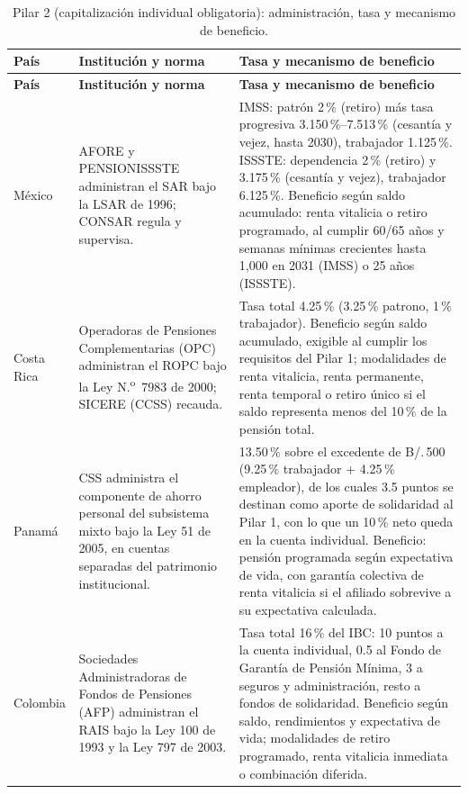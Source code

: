 \documentclass[12pt, letterpaper]{article}
\begin{document}
\begin{xltabular}{\textwidth}{P{1.6cm}Y Y}
\caption{Pilar 2 (capitalización individual obligatoria): administración, tasa y mecanismo de beneficio.}
\label{tab:param_pilar2}\\
\toprule
\textbf{País} & \textbf{Institución y norma} & \textbf{Tasa y mecanismo de beneficio} \\
\midrule
\endfirsthead

\toprule
\textbf{País} & \textbf{Institución y norma} & \textbf{Tasa y mecanismo de beneficio} \\
\midrule
\endhead

\bottomrule
\endfoot

México &
AFORE y PENSIONISSSTE administran el SAR bajo la LSAR de 1996; CONSAR regula y supervisa. &
IMSS: patrón 2\,\% (retiro) más tasa progresiva 3.150\,\%--7.513\,\% (cesantía y vejez, hasta 2030), trabajador 1.125\,\%. ISSSTE: dependencia 2\,\% (retiro) y 3.175\,\% (cesantía y vejez), trabajador 6.125\,\%. Beneficio según saldo acumulado: renta vitalicia o retiro programado, al cumplir 60/65 años y semanas mínimas crecientes hasta 1{,}000 en 2031 (IMSS) o 25 años (ISSSTE). \\

Costa Rica &
Operadoras de Pensiones Complementarias (OPC) administran el ROPC bajo la Ley N.\textsuperscript{o}~7983 de 2000; SICERE (CCSS) recauda. &
Tasa total 4.25\,\% (3.25\,\% patrono, 1\,\% trabajador). Beneficio según saldo acumulado, exigible al cumplir los requisitos del Pilar 1; modalidades de renta vitalicia, renta permanente, renta temporal o retiro único si el saldo representa menos del 10\,\% de la pensión total. \\

Panamá &
CSS administra el componente de ahorro personal del subsistema mixto bajo la Ley 51 de 2005, en cuentas separadas del patrimonio institucional. &
13.50\,\% sobre el excedente de B/.\,500 (9.25\,\% trabajador + 4.25\,\% empleador), de los cuales 3.5 puntos se destinan como aporte de solidaridad al Pilar 1, con lo que un 10\,\% neto queda en la cuenta individual. Beneficio: pensión programada según expectativa de vida, con garantía colectiva de renta vitalicia si el afiliado sobrevive a su expectativa calculada. \\

Colombia &
Sociedades Administradoras de Fondos de Pensiones (AFP) administran el RAIS bajo la Ley 100 de 1993 y la Ley 797 de 2003. &
Tasa total 16\,\% del IBC: 10 puntos a la cuenta individual, 0.5 al Fondo de Garantía de Pensión Mínima, 3 a seguros y administración, resto a fondos de solidaridad. Beneficio según saldo, rendimientos y expectativa de vida; modalidades de retiro programado, renta vitalicia inmediata o combinación diferida. \\


\end{xltabular}
\end{document}

